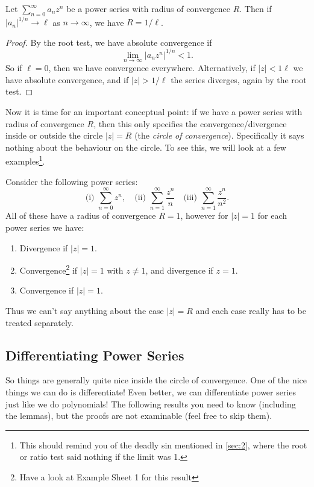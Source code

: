 \documentclass[a4paper]{scrartcl}
\begin{document}
\begin{lemma}
	Let $\sum_{n = 0}^{\infty} a_n z^n$ be a power series with radius of convergence $R$.
	Then if $|a_{n}|^{1/n} \rightarrow \ell$ as $n \rightarrow \infty$, we have $R = 1/\ell$.
\end{lemma}
\begin{proof}
	By the root test, we have absolute convergence if
	$$
	\lim_{n \to \infty} |a_n z^n|^{1/n} < 1.
	$$
	So if $\ell = 0$, then we have convergence everywhere. Alternatively, if $|z| < 1\ell$ we have absolute convergence, and if $|z| > 1/\ell$ the series diverges, again by the root test.
\end{proof}

Now it is time for an important conceptual point: if we have a power series with radius of convergence $R$, then this only specifies the convergence/divergence inside or outside the circle $|z| = R$ (the \emph{circle of convergence}). Specifically {\color{red} it says nothing about the behaviour on the circle.} To see this, we will look at a few examples\footnote{This should remind you of the deadly sin mentioned in \autoref{sec:2}, where the root or ratio test said nothing if the limit was 1.}.

\begin{example}[Convergence on $|z| = R$]
	Consider the following power series:
	$$
	\text{(i) }\sum_{n = 0}^{\infty} z^n, \quad \text{(ii) }\sum_{n = 1}^\infty \frac{z^n}{n}\quad \text{(iii) }\sum_{n = 1}^\infty \frac{z^n}{n^2}.
	$$
	All of these have a radius of convergence $R = 1$, however for $|z| = 1$ for each power series we have:
	\begin{enumerate}
		\item Divergence if $|z| = 1$.
		\item Convergence\footnote{Have a look at Example Sheet 1 for this result} if $|z| = 1$ with $z \neq 1$, and divergence if $z = 1$.
		\item Convergence if $|z| = 1$.
	\end{enumerate}
	Thus we can't say anything about the case $|z| = R$ and each case really has to be treated separately.
\end{example}

\subsection{Differentiating Power Series}

So things are generally quite nice inside the circle of convergence. One of the nice things we can do is differentiate! Even better, we can differentiate power series just like we do polynomials!
The following results you need to know (including the lemmas), but the proofs are not examinable (feel free to skip them).
\end{document}
